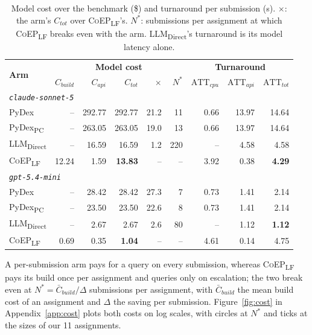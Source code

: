 \documentclass[acmsmall,screen,review,anonymous,nonacm]{acmart}
\newcommand{\coepLF}{\textsc{CoEP}\textsubscript{LF}\xspace}
\newcommand{\pydexPC}{PyDex\textsubscript{PC}\xspace}
\newcommand{\direct}{LLM\textsubscript{Direct}\xspace}
\newcommand{\V}[1]{\ensuremath{\mathit{#1}}}
\newcommand{\cs}{\texttt{claude-sonnet-5}\xspace}
\newcommand{\gm}{\texttt{gpt-5.4-mini}\xspace}
\begin{document}
\begin{table}[t]
\caption{Model cost over the benchmark (\$) and turnaround per submission (s). $\times$: the arm's $C_{\V{tot}}$ over \coepLF's. $N^{*}$: submissions per assignment at which \coepLF breaks even with the arm. \direct's turnaround is its model latency alone.}
\label{tab:cost}
\centering
\small
\begin{tabular}{l||rrr|rr||rrr}
\toprule
\multirow{2}{*}{\textbf{Arm}} & \multicolumn{5}{c||}{\textbf{Model cost}} & \multicolumn{3}{c}{\textbf{Turnaround}} \\
\cline{2-9}
 & $C_{\V{build}}$ & $C_{\V{api}}$ & $C_{\V{tot}}$ & $\times$ & $N^{*}$ & $\mathrm{ATT}_{\V{cpu}}$ & $\mathrm{ATT}_{\V{api}}$ & $\mathrm{ATT}_{\V{tot}}$ \\
\midrule\midrule
\multicolumn{9}{l}{\emph{\cs}} \\
PyDex~\cite{zhang2024pydex} & -- & 292.77 & 292.77 & 21.2 & 11 & 0.66 & 13.97 & 14.64 \\
\pydexPC & -- & 263.05 & 263.05 & 19.0 & 13 & 0.66 & 13.97 & 14.64 \\
\direct & -- & 16.59 & 16.59 & 1.2 & 220 & -- & 4.58 & 4.58 \\
\coepLF & 12.24 & 1.59 & \textbf{13.83} & -- & -- & 3.92 & 0.38 & \textbf{4.29} \\
\midrule
\multicolumn{9}{l}{\emph{\gm}} \\
PyDex~\cite{zhang2024pydex} & -- & 28.42 & 28.42 & 27.3 & 7 & 0.73 & 1.41 & 2.14 \\
\pydexPC & -- & 23.50 & 23.50 & 22.6 & 8 & 0.73 & 1.41 & 2.14 \\
\direct & -- & 2.67 & 2.67 & 2.6 & 80 & -- & 1.12 & \textbf{1.12} \\
\coepLF & 0.69 & 0.35 & \textbf{1.04} & -- & -- & 4.61 & 0.14 & 4.75 \\
\bottomrule
\end{tabular}
\end{table}

A per-submission arm pays for a query on every submission, whereas \coepLF pays its build once per assignment and queries only on escalation; the two break even at $N^{*} = \bar{C}_{\V{build}} / \Delta$ submissions per assignment, with $\bar{C}_{\V{build}}$ the mean build cost of an assignment and $\Delta$ the saving per submission. Figure~\ref{fig:cost} in Appendix~\ref{app:cost} plots both costs on log scales, with circles at $N^{*}$ and ticks at the sizes of our 11 assignments.
\end{document}
